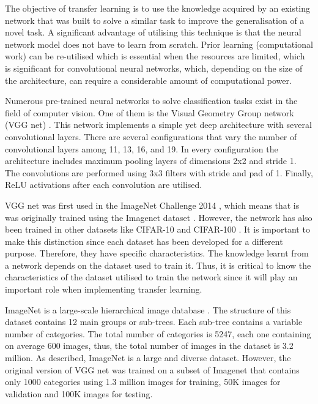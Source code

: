 \documentclass{article}
\begin{document}
The objective of transfer learning is to use the knowledge acquired by an existing network that was built to solve a similar task to improve the generalisation of a novel task. A significant advantage of utilising this technique is that the neural network model does not have to learn from scratch. Prior learning (computational work) can be re-utilised which is essential when the resources are limited, which is significant for convolutional neural networks, which, depending on the size of the architecture, can require a considerable amount of computational power.

Numerous pre-trained neural networks to solve classification tasks exist in the field of computer vision. One of them is the Visual Geometry Group network (VGG net) \cite{DBLP:journals/corr/SimonyanZ14a}. This network implements a simple yet deep architecture with several convolutional layers. There are several configurations that vary the number of convolutional layers among 11, 13, 16, and 19. In every configuration the architecture includes maximum pooling layers of dimensions 2x2 and stride 1. The convolutions are performed using 3x3 filters with stride and pad of 1. Finally, ReLU activations after each convolution are utilised.

VGG net was first used in the ImageNet Challenge 2014 \cite{DBLP:journals/corr/SimonyanZ14a}, which means that is was originally trained using the Imagenet dataset \cite{deng2009imagenet}. However, the network has also been trained in other datasets like CIFAR-10 \cite{krizhevsky2014cifar} and CIFAR-100 \cite{CIFAR-100}. It is important to make this distinction since each dataset has been developed for a different purpose. Therefore, they have specific characteristics. The knowledge learnt from a network depends on the dataset used to train it. Thus, it is critical to know the characteristics of the dataset utilised to train the network since it will play an important role when implementing transfer learning.

ImageNet is a large-scale hierarchical image database \cite{ImageNet}. The structure of this dataset contains 12 main groups or sub-trees. Each sub-tree contains a variable number of categories. The total number of categories is 5247, each one containing on average 600 images, thus, the total number of images in the dataset is 3.2 million. As described, ImageNet is a large and diverse dataset. However, the original version of VGG net was trained on a subset of Imagenet that contains only 1000 categories using 1.3 million images for training, 50K images for validation and 100K images for testing.
\end{document}
